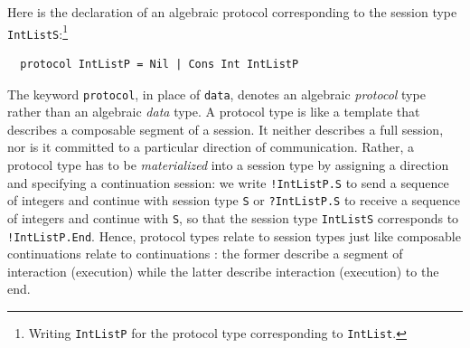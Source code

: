 Here is the declaration of an algebraic
protocol corresponding to the session type \lstinline+IntListS+:\footnote{Writing
  \lstinline+IntListP+ for the protocol type corresponding to
  \lstinline+IntList+.}
\begin{lstlisting}
  protocol IntListP = Nil | Cons Int IntListP
\end{lstlisting}
The keyword \lstinline+protocol+, in place of \lstinline+data+, denotes an
algebraic \emph{protocol} type rather than an algebraic \emph{data} type. A
protocol type is like a template that describes a composable segment of a
session. It neither describes a full session, nor is it committed to a
particular direction of communication. Rather, a protocol type has to be
\emph{materialized} into a session type by assigning a direction and specifying
a continuation session: we write \lstinline+!IntListP.S+ to send a sequence of
integers and continue with session type \lstinline+S+ or \lstinline+?IntListP.S+
to receive a sequence of integers and continue with \lstinline+S+, so that the
session type \lstinline/IntListS/ corresponds to \lstinline/!IntListP.End/.
Hence, protocol types relate to session types just like composable continuations
relate to continuations \cite{DBLP:conf/popl/Felleisen88,DanvyFilinski1992}: the
former describe a segment of interaction (execution) while the latter describe
interaction (execution) to the end.

